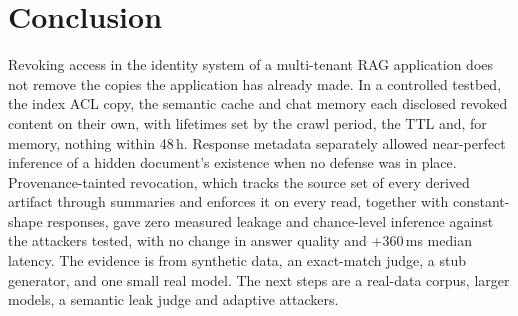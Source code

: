 \section{Conclusion}
\label{sec:conclusion}

Revoking access in the identity system of a multi-tenant RAG application does not remove the copies the application has already made. In a controlled testbed, the index ACL copy, the semantic cache and chat memory each disclosed revoked content on their own, with lifetimes set by the crawl period, the TTL and, for memory, nothing within 48\,h. Response metadata separately allowed near-perfect inference of a hidden document's existence when no defense was in place. Provenance-tainted revocation, which tracks the source set of every derived artifact through summaries and enforces it on every read, together with constant-shape responses, gave zero measured leakage and chance-level inference against the attackers tested, with no change in answer quality and +360\,ms median latency. The evidence is from synthetic data, an exact-match judge, a stub generator, and one small real model. The next steps are a real-data corpus, larger models, a semantic leak judge and adaptive attackers.
